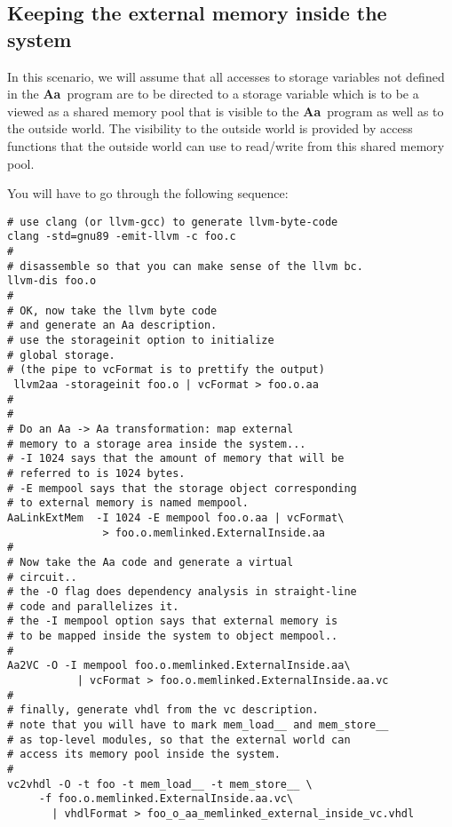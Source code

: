 \documentclass{article}
\newcommand{\Aa}{{\bf Aa}~}
\begin{document}
\subsection{Keeping the external memory inside the system}

In this scenario, we will assume that all accesses to 
storage variables not defined in the \Aa program are 
to be directed to a storage variable which is to be
a viewed as a shared memory pool that is visible to the
\Aa program as well as to the outside world.  The visibility
to the outside world is provided by access functions
that the outside world can use to read/write from this
shared memory pool.

You will have to go through the following sequence:
\begin{verbatim}
# use clang (or llvm-gcc) to generate llvm-byte-code
clang -std=gnu89 -emit-llvm -c foo.c
#
# disassemble so that you can make sense of the llvm bc.
llvm-dis foo.o
#
# OK, now take the llvm byte code
# and generate an Aa description.
# use the storageinit option to initialize
# global storage.
# (the pipe to vcFormat is to prettify the output)
 llvm2aa -storageinit foo.o | vcFormat > foo.o.aa
#
#
# Do an Aa -> Aa transformation: map external
# memory to a storage area inside the system...
# -I 1024 says that the amount of memory that will be
# referred to is 1024 bytes.
# -E mempool says that the storage object corresponding
# to external memory is named mempool.
AaLinkExtMem  -I 1024 -E mempool foo.o.aa | vcFormat\
               > foo.o.memlinked.ExternalInside.aa
#
# Now take the Aa code and generate a virtual
# circuit..
# the -O flag does dependency analysis in straight-line
# code and parallelizes it.
# the -I mempool option says that external memory is
# to be mapped inside the system to object mempool..
#
Aa2VC -O -I mempool foo.o.memlinked.ExternalInside.aa\
           | vcFormat > foo.o.memlinked.ExternalInside.aa.vc
#
# finally, generate vhdl from the vc description.
# note that you will have to mark mem_load__ and mem_store__
# as top-level modules, so that the external world can
# access its memory pool inside the system.
#
vc2vhdl -O -t foo -t mem_load__ -t mem_store__ \ 
     -f foo.o.memlinked.ExternalInside.aa.vc\
       | vhdlFormat > foo_o_aa_memlinked_external_inside_vc.vhdl
\end{verbatim}
\end{document}
